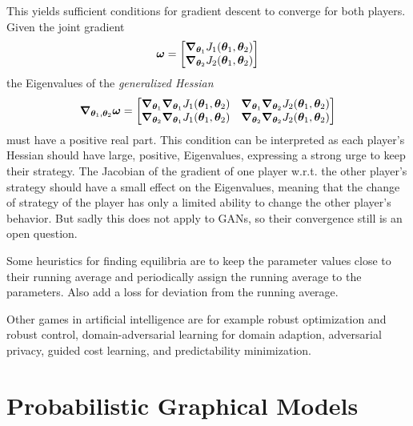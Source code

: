		This yields sufficient conditions for gradient descent to converge for both players. Given the joint gradient
		\begin{equation}
			\bm{\omega} =
				\begin{bmatrix}
					\grad_{\bm{\theta}_1} J_1(\bm{\theta}_1, \bm{\theta}_2) \\
					\grad_{\bm{\theta}_2} J_2(\bm{\theta}_1, \bm{\theta}_2)
				\end{bmatrix}
		\end{equation}
		the Eigenvalues of the \emph{generalized Hessian}
		\begin{equation}
			\grad_{\bm{\theta}_1, \bm{\theta}_2} \bm{\omega} =
				\begin{bmatrix}
					\grad_{\bm{\theta}_1} \grad_{\bm{\theta}_1} J_1(\bm{\theta}_1, \bm{\theta}_2) & \grad_{\bm{\theta}_1} \grad_{\bm{\theta}_2} J_2(\bm{\theta}_1, \bm{\theta}_2) \\
					\grad_{\bm{\theta}_2} \grad_{\bm{\theta}_1} J_1(\bm{\theta}_1, \bm{\theta}_2) & \grad_{\bm{\theta}_2} \grad_{\bm{\theta}_2} J_2(\bm{\theta}_1, \bm{\theta}_2)
				\end{bmatrix}
		\end{equation}
		must have a positive real part. This condition can be interpreted as each player's Hessian should have large, positive, Eigenvalues, expressing a strong urge to keep their strategy. The Jacobian of the gradient of one player w.r.t. the other player's strategy should have a small effect on the Eigenvalues, meaning that the change of strategy of the player has only a limited ability to change the other player's behavior. But sadly this does not apply to GANs, so their convergence still is an open question.

		Some heuristics for finding equilibria are to keep the parameter values close to their running average and periodically assign the running average to the parameters. Also add a loss for deviation from the running average.

		Other games in artificial intelligence are for example robust optimization and robust control, domain-adversarial learning for domain adaption, adversarial privacy, guided cost learning, and predictability minimization.

\chapter{Probabilistic Graphical Models} %

